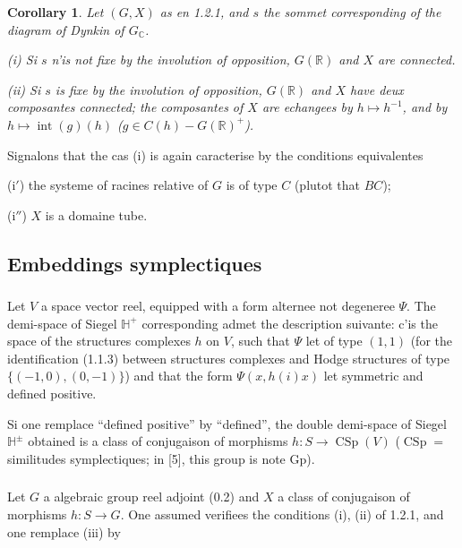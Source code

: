 \documentclass[12pt,a4paper]{article}
\theoremstyle{plain}
\newtheorem{corollary}[theorem]{Corollary}
\theoremstyle{definition}
\theoremstyle{remark}
\DeclareMathOperator{\CSp}{CSp}
\DeclareMathOperator{\Int}{int}
\newcommand{\RR}{\mathbb{R}}
\newcommand{\CC}{\mathbb{C}}
\newcommand{\HH}{\mathbb{H}}
\begin{document}
\begin{corollary}
Let $(G,X)$ as en \textup{1.2.1}, and $s$ the sommet corresponding of the diagram of Dynkin of $G_{\CC}$.

\textup{(i)} Si $s$ n'is not fixe by the involution of opposition, $G(\RR)$ and $X$ are connected.

\textup{(ii)} Si $s$ is fixe by the involution of opposition, $G(\RR)$ and $X$ have deux composantes connected; the composantes of $X$ are echangees by $h \mapsto h^{-1}$, and by $h \mapsto \Int(g)(h)$ ($g \in C(h) - G(\RR)^+$).
\end{corollary}

Signalons that the cas (i) is again caracterise by the conditions equivalentes

(i$'$) the systeme of racines relative of $G$ is of type $C$ (plutot that $BC$);

(i$''$) $X$ is a domaine tube.

\subsection{Embeddings symplectiques}

\subsubsection{}

Let $V$ a space vector reel, equipped with a form alternee not degeneree $\Psi$. The demi-space of Siegel $\HH^+$ corresponding admet the description suivante: c'is the space of the structures complexes $h$ on $V$, such that $\Psi$ let of type $(1,1)$ (for the identification (1.1.3) between structures complexes and Hodge structures of type $\{(-1,0),(0,-1)\}$) and that the form $\Psi(x,h(i)x)$ let symmetric and defined positive.

Si one remplace ``defined positive'' by ``defined'', the double demi-space of Siegel $\HH^{\pm}$ obtained is a class of conjugaison of morphisms $h:S \to \CSp(V)$ ($\CSp =$ similitudes symplectiques; in [5], this group is note $\text{Gp}$).

\subsubsection{}

Let $G$ a algebraic group reel adjoint (0.2) and $X$ a class of conjugaison of morphisms $h:S \to G$. One assumed verifiees the conditions (i), (ii) of 1.2.1, and one remplace (iii) by
\end{document}
